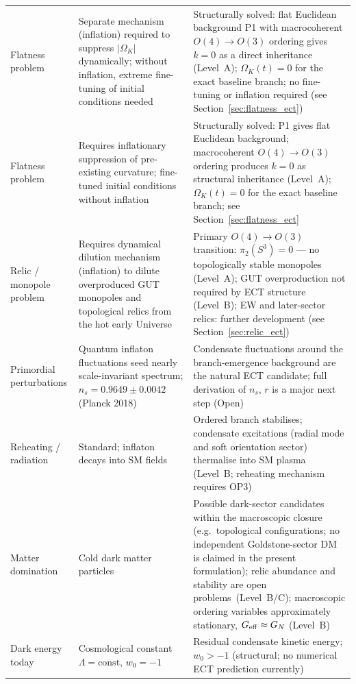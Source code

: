\documentclass[11pt,a4paper]{article}
\numberwithin{equation}{section}
\begin{document}
\begin{longtable}{@{}p{}p{}p{}@{}}
Flatness problem & Separate mechanism (inflation) required to suppress
  $|\Omega_K|$ dynamically; without inflation, extreme fine-tuning
  of initial conditions needed &
  Structurally solved: flat Euclidean background P1 with
  macrocoherent $O(4)\to O(3)$ ordering gives $k=0$ as a direct
  inheritance (Level~A); $\Omega_K(t)=0$ for the exact baseline
  branch; no fine-tuning or inflation required
  (see Section~\ref{sec:flatness_ect}) \\
Flatness problem & Requires inflationary suppression of pre-existing
  curvature; fine-tuned initial conditions without inflation &
  Structurally solved: P1 gives flat Euclidean background;
  macrocoherent $O(4)\to O(3)$ ordering produces
  $k=0$ as structural inheritance (Level~A);
  $\Omega_K(t)=0$ for the exact baseline branch;
  see Section~\ref{sec:flatness_ect} \\
Relic / monopole problem & Requires dynamical dilution mechanism
  (inflation) to dilute overproduced GUT monopoles and topological
  relics from the hot early Universe &
  Primary $O(4)\to O(3)$ transition:
  $\pi_2(S^3)=0$ --- no topologically stable monopoles
  (Level~A); GUT overproduction not required by ECT structure
  (Level~B); EW and later-sector relics: further development
  (see Section~\ref{sec:relic_ect}) \\
Primordial perturbations & Quantum inflaton fluctuations seed
  nearly scale-invariant spectrum; $n_s=0.9649\pm0.0042$
  (Planck 2018) &
  Condensate fluctuations around the branch-emergence background
  are the natural ECT candidate; full derivation of $n_s$, $r$
  is a major next step (Open) \\
Reheating / radiation & Standard; inflaton decays into SM fields &
  Ordered branch stabilises; condensate excitations
  (radial mode and soft orientation sector) thermalise into SM plasma
  (Level~B; reheating mechanism requires OP3) \\
Matter domination & Cold dark matter particles & Possible dark-sector candidates within the macroscopic closure
  (e.g.~topological configurations; no independent Goldstone-sector DM
  is claimed in the present formulation);
  relic abundance and stability are open problems~(Level~B/C);
  macroscopic ordering variables approximately stationary,
  $G_{\rm eff}\approx G_N$ (Level~B) \\
Dark energy today & Cosmological constant $\Lambda=\text{const}$,
  $w_0=-1$ & Residual condensate kinetic energy;
  $w_0>-1$ (structural; no numerical ECT prediction currently) \\

\end{longtable}
\end{document}
